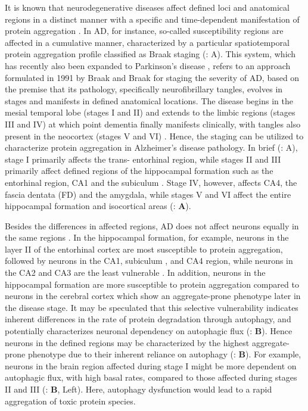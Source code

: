 It is known that neurodegenerative diseases affect defined loci and anatomical regions in a distinct manner with a specific and time-dependent manifestation of protein aggregation \citep{Wang2010a,Wang2010b}. In AD, for instance, so-called susceptibility regions are affected in a cumulative manner, characterized by a particular spatiotemporal protein aggregation profile classified as Braak staging (: A). This system, which has recently also been expanded to Parkinson’s disease \citep{Braak2004}, refers to an approach formulated in 1991 by Braak and Braak for staging the severity of AD, based on the premise that its pathology, specifically neurofibrillary tangles, evolves in stages and manifests in defined anatomical locations. The disease begins in the mesial temporal lobe (stages I and II) and extends to the limbic regions (stages III and IV) at which point dementia finally manifests clinically, with tangles also present in the neocortex (stages V and VI) \citep{Braak1991}. Hence, the staging can be utilized to characterize protein aggregation in Alzheimer’s disease pathology. In brief (: A), stage I primarily affects the trans- entorhinal region, while stages II and III primarily affect defined regions of the hippocampal formation such as the entorhinal region, CA1 and the subiculum \citep{Braak1991,Braak2012}. Stage IV, however, affects CA4, the fascia dentata (FD) and the amygdala, while stages V and VI affect the entire hippocampal formation and isocortical areas \citep{Braak1991} (: \textbf{A}). 

Besides the differences in affected regions, AD does not affect neurons equally in the same regions \citep{Wang2010a,Wang2010b}. In the hippocampal formation, for example, neurons in the layer II of the entorhinal cortex are most susceptible to protein aggregation, followed by neurons in the CA1, subiculum \citep{Wang2010a,Wang2010b}, and CA4 region, while neurons in the CA2 and CA3 are the least vulnerable \citep{Schonheit2004,Wang2010a,Wang2010b}. In addition, neurons in the hippocampal formation are more susceptible to protein aggregation compared to neurons in the cerebral cortex which show an aggregate-prone phenotype later in the disease stage. It may be speculated that this selective vulnerability indicates inherent differences in the rate of protein degradation through autophagy, and potentially characterizes neuronal dependency on autophagic flux (: \textbf{B}). Hence neurons in the defined regions may be characterized by the highest aggregate-prone phenotype due to their inherent reliance on autophagy (: \textbf{B}). For example, neurons in the brain region affected during stage I might be more dependent on autophagic flux, with high basal rates, compared to those affected during stages II and III (: \textbf{B}, Left). Here, autophagy dysfunction would lead to a rapid aggregation of toxic protein species. 

